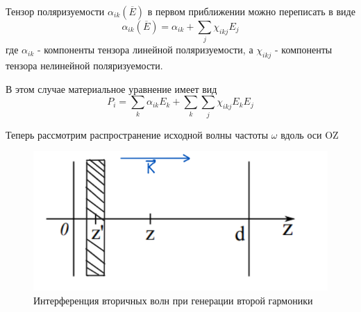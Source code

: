 \documentclass[a4paper,12pt]{article} %
\begin{document}
Тензор поляризуемости $\alpha_{ik} (\overline{E})$ в первом приближении можно переписать в виде
\begin{equation}
\alpha_{ik}(\overline{E}) = \alpha_{ik} + \sum_j \chi_{ikj} E_j
\end{equation}
где $\alpha_{ik}$ - компоненты тензора линейной поляризуемости, а $\chi_{ikj}$ - компоненты тензора нелинейной поляризуемости.

В этом случае материальное уравнение имеет вид
\begin{equation}
P_i = \sum_k \alpha_{ik} E_k + \sum_k \sum_j \chi_{ikj} E_k E_j
\label{pol}
\end{equation}

Теперь рассмотрим распространение исходной волны частоты $\omega$ вдоль оси OZ

\begin{figure}[H]
\centering
\includegraphics[scale=1]{pic1.png}
\caption{Интерференция вторичных волн при генерации второй гармоники}
\end{figure}
\end{document}
